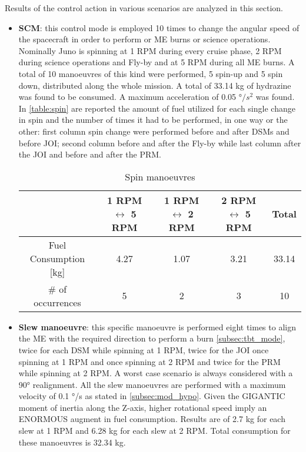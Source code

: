 Results of the control action in various scenarios are analyzed in this section.
\begin{itemize}
    \item \textbf{SCM}: this control mode is employed 10 times to change the angular speed of the spacecraft in order to perform or ME burns or science operations. Nominally Juno is spinning at 1 RPM during every cruise phase, 2 RPM during science operations and Fly-by and at 5 RPM during all ME burns. A total of 10 manoeuvres of this kind were performed, 5 spin-up and 5 spin down, distributed along the whole mission.  A total of 33.14 kg of hydrazine was found to be consumed. A maximum acceleration of 0.05 °$/s^2$ was found. In \autoref{table:spin} are reported the amount of fuel utilized for each single change in spin and the number of times it had to be performed, in one way or the other: first column spin change were performed before and after DSMs and before JOI; second column before and after the Fly-by while last column after the JOI and before and after the PRM.
    
    \begin{table}[H]
        \renewcommand{\arraystretch}{1.3}
        \centering
        \begin{tabular}{|c|c|c|c|c|}
            \hline
            &\textbf{1 RPM $\leftrightarrow$ 5 RPM } & \textbf{1 RPM $\leftrightarrow$ 2 RPM } &\textbf{2 RPM $\leftrightarrow$ 5 RPM} & \textbf{Total} \\
            \hline
            \hline
            Fuel Consumption [kg] & 4.27 & 1.07 & 3.21 & 33.14 \\
            \hline
            \# of occurrences & 5 & 2 & 3 & 10 \\
            \hline
        \end{tabular}
        \caption{Spin manoeuvres}
        \label{table:spin}
    \end{table}

    \item \textbf{Slew manoeuvre}: this specific manoeuvre is performed eight times to align the ME with the required direction to perform a burn \autoref{subsec:tbt_mode}, twice for each DSM while spinning at 1 RPM, twice for the JOI once spinning at 1 RPM and once spinning at 2 RPM and twice for the PRM while spinning at 2 RPM. A worst case scenario is always considered with a 90° realignment. \cite{LL_early_cruise} 
    All the slew manoeuvres are performed with a maximum velocity of 0.1 °/s as stated in \autoref{subsec:mod_hypo}. 
    Given the GIGANTIC moment of inertia along the Z-axis, higher rotational speed imply an ENORMOUS augment in fuel consumption. Results are of 2.7 kg for each slew at 1 RPM and 6.28 kg for each slew at 2 RPM.  Total consumption for these manoeuvres is 32.34 kg. 
    

\end{itemize}
